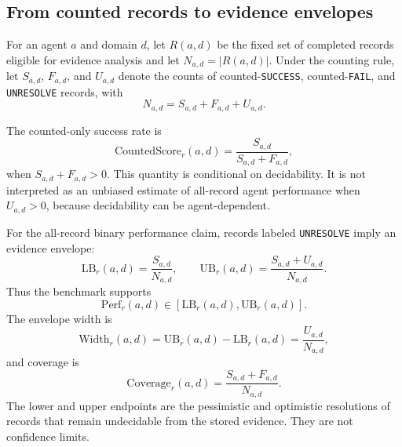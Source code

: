 \documentclass{article}
\begin{document}
\subsection{From counted records to evidence envelopes}
\label{sec:envelope}

For an agent \(a\) and domain \(d\), let \(R(a,d)\) be the fixed set of
completed records eligible for evidence analysis and let \(N_{a,d}=|R(a,d)|\).
Under the counting rule, let \(S_{a,d}\), \(F_{a,d}\), and \(U_{a,d}\) denote
the counts of counted-\texttt{SUCCESS}, counted-\texttt{FAIL}, and
\texttt{UNRESOLVE} records, with
\[
N_{a,d}=S_{a,d}+F_{a,d}+U_{a,d}.
\]

The counted-only success rate is
\[
\mathrm{CountedScore}_{r}(a,d)=\frac{S_{a,d}}{S_{a,d}+F_{a,d}},
\]
when \(S_{a,d}+F_{a,d}>0\). This quantity is conditional on decidability. It is
not interpreted as an unbiased estimate of all-record agent performance when
\(U_{a,d}>0\), because decidability can be agent-dependent.

For the all-record binary performance claim, records labeled
\texttt{UNRESOLVE} imply an evidence envelope:
\[
\mathrm{LB}_{r}(a,d)=\frac{S_{a,d}}{N_{a,d}},
\qquad
\mathrm{UB}_{r}(a,d)=\frac{S_{a,d}+U_{a,d}}{N_{a,d}}.
\]
Thus the benchmark supports
\[
\mathrm{Perf}_{r}(a,d)\in
[\mathrm{LB}_{r}(a,d),\mathrm{UB}_{r}(a,d)].
\]
The envelope width is
\[
\mathrm{Width}_{r}(a,d)=\mathrm{UB}_{r}(a,d)-\mathrm{LB}_{r}(a,d)
=\frac{U_{a,d}}{N_{a,d}},
\]
and coverage is
\[
\mathrm{Coverage}_{r}(a,d)=\frac{S_{a,d}+F_{a,d}}{N_{a,d}}.
\]
The lower and upper endpoints are the pessimistic and optimistic resolutions of
records that remain undecidable from the stored evidence. They are not
confidence limits.
\end{document}
